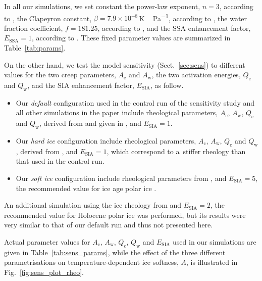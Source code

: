 \documentclass[tc, manuscript]{copernicus}
\begin{document}
      In all our simulations, we set constant the power-law exponent, $n=3$,
      according to \citet[p.~55--57]{Cuffey.Paterson.2010}, the Clapeyron
      constant, $\beta=7.9\times 10^{-8}$\,\unit{K\,Pa^{-1}}, according to
      \citet{Luthi.etal.2002}, the water fraction coefficient, $f=181.25$,
      according to \citet{Lliboutry.Duval.1985}, and the SSA enhancement
      factor, $E_{\text{SSA}}=1$, according to
      \citet[p.~77]{Cuffey.Paterson.2010}. These fixed parameter values are
      summarized in Table~\ref{tab:params}.

      On the other hand, we test the model sensitivity
      (Sect.~\ref{sec:sens}) to different values for the two creep
      parameters, $A_{\mathrm{c}}$ and $A_{\mathrm{w}}$, the two activation
      energies, $Q_{\mathrm{c}}$ and $Q_{\mathrm{w}}$, and the SIA
      enhancement factor, $E_{\text{SIA}}$, as follow.
%
\begin{itemize}
  \item Our \emph{default} configuration used in the control run of the
    sensitivity study and all other simulations in the paper include
    rheological parameters,
    $A_{\mathrm{c}}$, $A_{\mathrm{w}}$, $Q_{\mathrm{c}}$ and
    $Q_{\mathrm{w}}$, derived from \citet{Paterson.Budd.1982} and given in
    \citet[Eqn.~5]{Bueler.Brown.2009}, and $E_{\text{SIA}}=1$.
  \item Our \emph{hard ice} configuration include rheological parameters,
    $A_{\mathrm{c}}$, $A_{\mathrm{w}}$, $Q_{\mathrm{c}}$ and
    $Q_{\mathrm{w}}$, derived from \citet[p.~72 and
    76]{Cuffey.Paterson.2010}, and $E_{\text{SIA}}=1$, which correspond to
    a~stiffer rheology than that used in the control run.
  \item Our \emph{soft ice} configuration include rheological parameters
    from \citet{Cuffey.Paterson.2010}, and $E_{\text{SIA}}=5$, the
    recommended value for ice age polar ice
    \citep[p.~77]{Cuffey.Paterson.2010}.
\end{itemize}
%
      An additional simulation using the ice rheology from
      \citet{Cuffey.Paterson.2010} and $E_{\text{SIA}}=2$, the recommended
      value for Holocene polar ice \citep[p.~77]{Cuffey.Paterson.2010} was
      performed, but its results were very similar to that of our default
      run and thus not presented here.

      Actual parameter values for $A_{\mathrm{c}}$, $A_{\mathrm{w}}$,
      $Q_{\mathrm{c}}$, $Q_{\mathrm{w}}$ and $E_{\text{SIA}}$ used in our
      simulations are given in Table~\ref{tab:sens_params}, while the effect
      of the three different parametrisations on temperature-dependent ice
      softness, $A$, is illustrated in Fig.~\ref{fig:sens_plot_rheo}.
\end{document}
